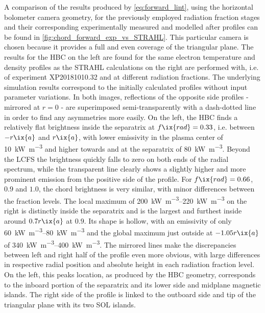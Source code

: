 %
            A comparison of the results produced by \cref{eq:forward_lint}, using the horizontal bolometer camera geometry, for the previously employed radiation fraction stages and their corresponding experimentally measured and modelled after profiles can be found in \cref{fig:chord_forward_exp_vs_STRAHL}. This particular camera is chosen because it provides a full and even coverage of the triangular plane. The results for the HBC on the left are found for the same electron temperature and density profiles as the STRAHL calculations on the right are performed with, i.e. of experiment XP20181010.32 and at different radiation fractions. The underlying simulation results correspond to the initially calculated profiles without input parameter variations. In both images, reflections of the opposite side profiles - mirrored at $r=0$ - are superimposed semi-transparently with a dash-dotted line in order to find any asymmetries more easily. On the left, the HBC finds a relatively flat brightness inside the separatrix at $f\ix{rad}=0.33$, i.e. between $-r\ix{a}$ and $r\ix{a}$, with lower emissivity in the plasma center of \SI{10}{\kilo\watt\per\cubic\meter} and higher towards and at the separatrix of \SI{80}{\kilo\watt\per\cubic\meter}. Beyond the LCFS the brightness quickly falls to zero on both ends of the radial spectrum, while the transparent line clearly shows a slightly higher and more prominent emission from the positive side of the profile. For $f\ix{rad}=0.66$, $0.9$ and $1.0$, the chord brightness is very similar, with minor differences between the fraction levels. The local maximum of \SIrange{200}{220}{\kilo\watt\per\cubic\meter} on the right is distinctly inside the separatrix and is the largest and furthest inside around $0.7r\ix{a}$ at $0.9$. Its shape is hollow, with an emissivity of only \SIrange{60}{80}{\kilo\watt\per\cubic\meter} and the global maximum just outside at $-1.05r\ix{a}$ of \SIrange{340}{400}{\kilo\watt\per\cubic\meter}. The mirrored lines make the discrepancies between left and right half of the profile even more obvious, with large differences in respective radial position and absolute height in each radiation fraction level. On the left, this peaks location, as produced by the HBC geometry, corresponds to the inboard portion of the separatrix and its lower side and midplane magnetic islands. The right side of the profile is linked to the outboard side and tip of the triangular plane with its two SOL islands.\\%
